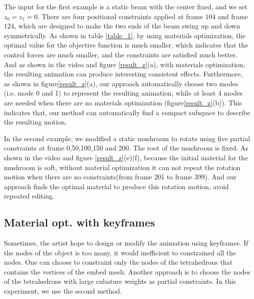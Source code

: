 \documentclass[9pt,twocolumn]{extarticle}
\begin{document}
The input for the first example is a static beam with the center fixed, and we
set $z_0=z_{1}=0$. There are four positional constraints applied at frame $104$
and frame $124$, which are designed to make the two ends of the beam swing up
and down symmetrically. As shown in table \ref{table_1}, by using materials
optimization, the optimal value for the objective function is much smaller,
which indicates that the control forces are much smaller, and the constraints
are satisfied much better. And as shown in the video and figure
\ref{result_z}(a), with materials optimization, the resulting animation can
produce interesting consistent effects. Furthermore, as shown in
figure\ref{result_z}(a), our approach automatically choose two modes (i.e. mode
0 and 1) to represent the resulting animation, while at least 4 modes are needed
when there are no materials optimization (figure\ref{result_z}(b)). This
indicates that, our method can automatically find a compact subspace to describe
the resulting motion.

In the second example, we modified a static mushroom to rotate using five
partial constraints at frame 0,50,100,150 and 200. The root of the mushroom is
fixed. As shown in the video and figure \ref{result_z}(e)(f), because the
initial material for the mushroom is soft, without material optimization it can
not repeat the rotation motion when there are no constraints(from frame 201 to
frame 399). And our approach finds the optimal material to produce this rotation
motion, avoid repeated editing.

\subsection{Material opt. with keyframes}
Sometimes, the artist hope to design or modify the animation using keyframes. If
the nodes of the object is too many, it would inefficient to constrained all the
nodes. One can choose to constraint only the nodes of the tetrahedrons that
contains the vertices of the embed mesh. Another approach is to choose the nodes
of the tetrahedrons with large cubature weights as partial constraints. In this
experiment, we use the second method.
\end{document}
